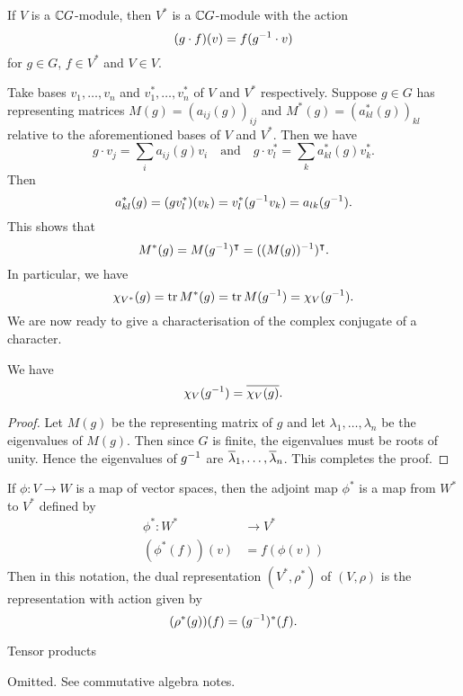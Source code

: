\begin{rmk}
  If $V$ is a $\mathbb{C} G$-module, then $V^*$ is a $\mathbb{C} G$-module with the action
  \[(g \cdot f)(v) = f(g^{-1} \cdot v)\]
  for $g \in G$, $f \in V^*$ and $V \in V$.
  
  Take bases $v_1,\ldots,v_n$ and $v_1^*,\ldots,v_n^*$ of $V$ and $V^*$ respectively.
  Suppose $g \in G$ has representing matrices $M(g)=(a_{ij}(g))_{ij}$ and $M^*(g)=(a^*_{kl}(g))_{kl}$ relative to the aforementioned bases of $V$ and $V^*$.
  Then we have
  \[g \cdot v_j = \sum_i a_{ij}(g) v_i \quad\text{and}\quad g \cdot v_l^* = \sum_k a_{kl}^*(g) v_k^*.\]
  Then
  \[a_{kl}^*(g) = (gv_l^*)(v_k) = v_l^*(g^{-1} v_k) = a_{lk}(g^{-1}).\]
  This shows that
  \[M^*(g) = M(g^{-1})^\intercal = ((M(g))^{-1})^\intercal.\]
  In particular, we have
  \[\chi_{V^*}(g) = \operatorname{tr} M^*(g) = \operatorname{tr} M(g^{-1}) = \chi_V(g^{-1}).\]
  We are now ready to give a characterisation of the complex conjugate of a character.
\end{rmk}

\begin{prop}
  We have
  \[\chi_V(g^{-1}) = \overline{\chi_V(g)}.\]
\end{prop}

\begin{proof}
  Let $M(g)$ be the representing matrix of $g$ and let $\lambda_1,\ldots,\lambda_n$ be the eigenvalues of $M(g)$.
  Then since $G$ is finite, the eigenvalues must be roots of unity.
  Hence the eigenvalues of $g^{-1}$ are $\overline\lambda_1,\ldots,\overline\lambda_n$.
  This completes the proof.
\end{proof}

\begin{rmk}
  If $\phi: V \to W$ is a map of vector spaces, then the adjoint map $\phi^*$ is a map from $W^*$ to $V^*$ defined by
  \begin{align*}
    \phi^*: W^* &\to V^* \\
    (\phi^*(f))(v) &= f(\phi(v))
  \end{align*}
  Then in this notation, the dual representation $(V^*,\rho^*)$ of $(V,\rho)$ is the representation with action given by
  \[(\rho^*(g))(f) = (g^{-1})^*(f).\]
\end{rmk}

Tensor products

Omitted.
See commutative algebra notes.
